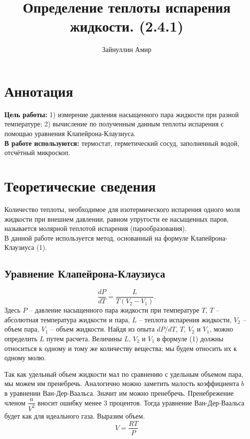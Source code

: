 \documentclass[a4paper, 12pt]{article}
\begin{document}
	

	\title{\textbf{Определение теплоты испарения жидкости. (2.4.1)}}
	\author{Зайнуллин Амир}
	\maketitle

	\section{Аннотация}
	
	\textbf{Цель работы:} 1) измерение давления насыщенного пара жидкости при разной температуре; 2) вычисление по полученным данным теплоты испарения с помощью уравнения Клапейрона-Клаузиуса. \\
	\textbf{В работе используются:} термостат, герметический сосуд, заполненный водой, отсчётный микроскоп.
	
	
	\section{Теоретические сведения}
	Количество теплоты, необходимое для изотермического испарения одного моля жидкости при внешнем давлении, равном упругости ее насыщенных паров, называется молярной теплотой испарения (парообразования). \\
	В данной работе используется метод, основанный на формуле Клапейрона-Клаузиуса (1).
	
	\subsection*{Уравнение Клапейрона-Клаузиуса}
	\begin{equation}
		\frac{dP}{dT}=\frac{L}{T\left(V_2-V_1\right)}.
	\end{equation}
	Здесь $ P $ -- давление насыщенного пара жидкости при температуре $ T $, $ T $ -- абсолютная температура жидкости и пара, $ L $ -- теплота испарения жидкости, $ V_2 $ -- объем пара, $ V_1 $ -- объем жидкости. Найдя из опыта $ dP/dT $, $ T $, $ V_2 $ и $ V_1 $, можно определить $ L $ путем расчета. Величины $ L $, $ V_2 $ и $ V_1 $ в формуле (1) должны относиться к одному и тому же количеству вещества; мы будем относить их к одному молю.

	Так как удельный объем жидкости мал по сравнению с удельным объемом пара, мы можем им пренебречь. Аналогично можно заметить малость коэффициента $b$ в уравнении Ван-Дер-Ваальса. Значит им можно пренебречь. Пренебрежение членом $\dfrac{a}{V^2}$ вносит ошибку менее 3 процентов. Тогда уравнение Ван-Дер-Ваальса будет как для идеального газа. Выразим объем. \\
	\[ V = \dfrac{RT}{P} \] 
	
\end{document}
